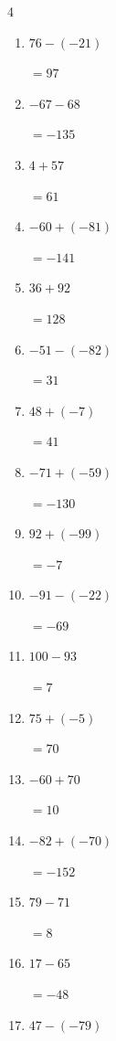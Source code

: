 \begin{multicols}{4}
\begin{enumerate}
        $=170$

  \item $76-(-21)$

        $=97$

  \item $-67-68$

        $=-135$

  \item $4+57$

        $=61$

  \item $-60+(-81)$

        $=-141$

  \item $36+92$

        $=128$

  \item $-51-(-82)$

        $=31$

  \item $48+(-7)$

        $=41$

  \item $-71+(-59)$

        $=-130$

  \item $92+(-99)$

        $=-7$

  \item $-91-(-22)$

        $=-69$

  \item $100-93$

        $=7$

  \item $75+(-5)$

        $=70$

  \item $-60+70$

        $=10$

  \item $-82+(-70)$

        $=-152$

  \item $79-71$

        $=8$

  \item $17-65$

        $=-48$

  \item $47-(-79)$


\end{enumerate}
\end{multicols}
